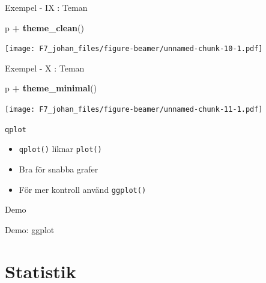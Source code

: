 \documentclass[
  11pt,
  ignorenonframetext,
  handout]{beamer}
\newenvironment{Shaded}{\begin{snugshade}}{\end{snugshade}}
\newcommand{\FunctionTok}[1]{\textcolor[rgb]{0.13,0.29,0.53}{\textbf{#1}}}
\newcommand{\NormalTok}[1]{#1}
\newcommand{\SpecialCharTok}[1]{\textcolor[rgb]{0.81,0.36,0.00}{\textbf{#1}}}
\providecommand{\tightlist}{%
  \setlength{\itemsep}{0pt}\setlength{\parskip}{0pt}}
\begin{document}
\begin{frame}[fragile]{Exempel - IX : Teman}
\label{exempel---ix-teman}
\begin{Shaded}
\begin{Highlighting}[]
\NormalTok{p }\SpecialCharTok{+} \FunctionTok{theme\_clean}\NormalTok{()}
\end{Highlighting}
\end{Shaded}

\texttt{[image: F7\_johan\_files/figure-beamer/unnamed-chunk-10-1.pdf]}
\end{frame}

\begin{frame}[fragile]{Exempel - X : Teman}
\label{exempel---x-teman}
\begin{Shaded}
\begin{Highlighting}[]
\NormalTok{p }\SpecialCharTok{+} \FunctionTok{theme\_minimal}\NormalTok{()}
\end{Highlighting}
\end{Shaded}

\texttt{[image: F7\_johan\_files/figure-beamer/unnamed-chunk-11-1.pdf]}
\end{frame}

\begin{frame}{\texttt{qplot}}
\label{section}
\begin{itemize}
\tightlist
\item
  \texttt{qplot()} liknar \texttt{plot()}
\item
  Bra för snabba grafer
\item
  För mer kontroll använd \texttt{ggplot()}
\end{itemize}
\end{frame}

\begin{frame}{Demo}
\label{demo}
\begin{block}{Demo: ggplot}
\label{demo-ggplot}
\end{block}
\end{frame}

\section{Statistik}\label{statistik}
\end{document}
